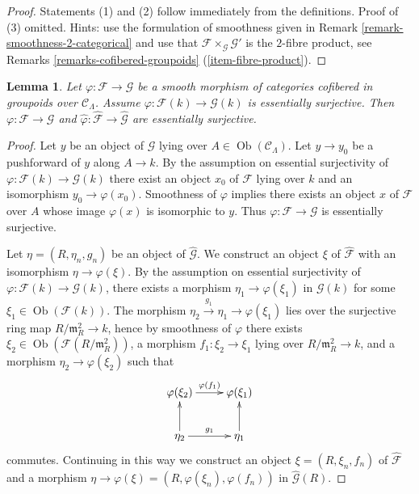 \documentclass{stacks-project}
\theoremstyle{plain}
\newtheorem{lemma}[subsection]{Lemma}
\theoremstyle{definition}
\theoremstyle{remark}
\numberwithin{equation}{subsection}
\def\Ob{\mathop{\mathrm{Ob}}\nolimits}
\begin{document}
\begin{proof}
Statements (1) and (2) follow immediately from the definitions.
Proof of (3) omitted. Hints: use the formulation of smoothness given in
Remark \ref{remark-smoothness-2-categorical}
and use that $\mathcal{F} \times_\mathcal{G} \mathcal{G}'$
is the $2$-fibre product, see
Remarks \ref{remarks-cofibered-groupoids} (\ref{item-fibre-product}).
\end{proof}

\begin{lemma}
\label{lemma-smooth-morphism-essentially-surjective}
Let $\varphi : \mathcal{F} \to \mathcal{G}$ be a smooth morphism of
categories cofibered in groupoids over $\mathcal{C}_\Lambda$.  Assume
$\varphi : \mathcal{F}(k) \to \mathcal{G}(k)$ is essentially surjective.
Then $\varphi : \mathcal{F} \to \mathcal{G}$ and
$\widehat{\varphi} : \widehat{\mathcal{F}} \to \widehat{\mathcal{G}}$
are essentially surjective.
\end{lemma}

\begin{proof}
Let $y$ be an object of $\mathcal{G}$ lying over
$A \in \Ob(\mathcal{C}_\Lambda)$. Let $y \to y_0$ be a pushforward
of $y$ along $A \to k$. By the assumption on essential surjectivity of
$\varphi : \mathcal{F}(k) \to \mathcal{G}(k)$ there exist an object
$x_0$ of $\mathcal{F}$ lying over $k$ and an isomorphism
$y_0 \to \varphi(x_0)$. Smoothness of $\varphi$ implies there exists
an object $x$ of $\mathcal{F}$ over $A$ whose image $\varphi(x)$
is isomorphic to $y$. Thus $\varphi : \mathcal{F} \to \mathcal{G}$
is essentially surjective.

\medskip\noindent
Let $\eta = (R, \eta_n, g_n)$ be an object of $\widehat{\mathcal{G}}$.  We
construct an object $\xi$ of $\widehat{\mathcal{F}}$ with an isomorphism
$\eta \to \varphi(\xi)$. By the assumption on essential surjectivity of
$\varphi : \mathcal{F}(k) \to \mathcal{G}(k)$, there exists a morphism
$\eta_1 \to \varphi(\xi_1)$ in $\mathcal{G}(k)$ for some
$\xi_1 \in \Ob(\mathcal{F}(k))$. The morphism
$\eta_2 \xrightarrow{g_1} \eta_1 \to \varphi(\xi_1)$
lies over the surjective ring map $R/\mathfrak m_R^2 \to k$, hence
by smoothness of $\varphi$ there exists
$\xi_2 \in \Ob(\mathcal{F}(R/\mathfrak m_R^2))$, a
morphism $f_1: \xi_2 \to \xi_1$ lying over
$R/\mathfrak m_R^2 \to k$, and a morphism
$\eta_2 \to \varphi(\xi_2)$ such that
$$
\xymatrix{
\varphi(\xi_2)  \ar[r]^{\varphi(f_1)} &  \varphi(\xi_{1})   \\
\eta_2   \ar[u] \ar[r]^{g_1}  & \eta_1  \ar[u] \\
}
$$
commutes. Continuing in this way we construct an object
$\xi = (R, \xi_n, f_n)$ of $\widehat{\mathcal{F}}$ and a morphism
$\eta \to \varphi(\xi) = (R, \varphi(\xi_n), \varphi(f_n))$
in $\widehat{\mathcal{G}}(R)$.
\end{proof}
\end{document}
